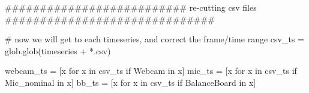 \documentclass[
  letterpaper,
  DIV=11,
  numbers=noendperiod]{scrreprt}
\newenvironment{Shaded}{\begin{snugshade}}{\end{snugshade}}
\newcommand{\CommentTok}[1]{\textcolor[rgb]{0.37,0.37,0.37}{#1}}
\newcommand{\ControlFlowTok}[1]{\textcolor[rgb]{0.00,0.23,0.31}{#1}}
\newcommand{\KeywordTok}[1]{\textcolor[rgb]{0.00,0.23,0.31}{#1}}
\newcommand{\NormalTok}[1]{\textcolor[rgb]{0.00,0.23,0.31}{#1}}
\newcommand{\OperatorTok}[1]{\textcolor[rgb]{0.37,0.37,0.37}{#1}}
\newcommand{\StringTok}[1]{\textcolor[rgb]{0.13,0.47,0.30}{#1}}
\begin{document}
\begin{Shaded}
\begin{Highlighting}[]
    \CommentTok{\#\#\#\#\#\#\#\#\#\#\#\#\#\#\#\#\#\#\#\#\#\#\#\#\#\# re{-}cutting csv files \#\#\#\#\#\#\#\#\#\#\#\#\#\#\#\#\#\#\#\#\#\#\#\#\#\#\#\#\#\#}

    \CommentTok{\# now we will get to each timeseries, and correct the frame/time range}
\NormalTok{    csv\_ts }\OperatorTok{=}\NormalTok{ glob.glob(timeseries }\OperatorTok{+} \StringTok{\textquotesingle{}*.csv\textquotesingle{}}\NormalTok{)}

\NormalTok{    webcam\_ts }\OperatorTok{=}\NormalTok{ [x }\ControlFlowTok{for}\NormalTok{ x }\KeywordTok{in}\NormalTok{ csv\_ts }\ControlFlowTok{if} \StringTok{\textquotesingle{}Webcam\textquotesingle{}} \KeywordTok{in}\NormalTok{ x]}
\NormalTok{    mic\_ts }\OperatorTok{=}\NormalTok{ [x }\ControlFlowTok{for}\NormalTok{ x }\KeywordTok{in}\NormalTok{ csv\_ts }\ControlFlowTok{if} \StringTok{\textquotesingle{}Mic\_nominal\textquotesingle{}} \KeywordTok{in}\NormalTok{ x]}
\NormalTok{    bb\_ts }\OperatorTok{=}\NormalTok{ [x }\ControlFlowTok{for}\NormalTok{ x }\KeywordTok{in}\NormalTok{ csv\_ts }\ControlFlowTok{if} \StringTok{\textquotesingle{}BalanceBoard\textquotesingle{}} \KeywordTok{in}\NormalTok{ x]}
    

\end{Highlighting}
\end{Shaded}
\end{document}
